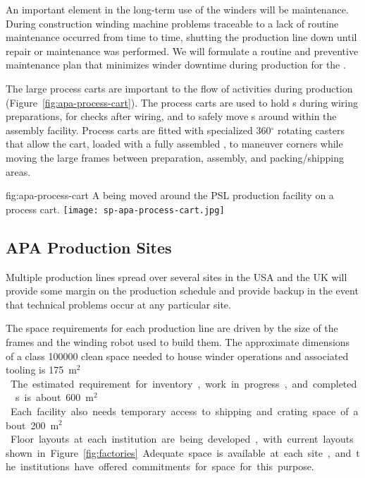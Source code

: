 An important element in the long-term use of the winders %
will be maintenance.  %
During  construction winding machine problems traceable to a lack of routine maintenance occurred from time to time, shutting the production line down until repair or maintenance was performed. We will formulate a routine and preventive maintenance plan that minimizes winder downtime during  production for the .

The large process carts are important to the %
flow of activities during production %
(Figure~\ref{fig:apa-process-cart}). The process carts are used to hold s during wiring preparations,  for  checks after wiring, and to safely move s around within the assembly facility. Process carts are fitted with specialized 360$^\circ$ rotating casters that allow the cart, loaded with a fully assembled , to maneuver corners while moving the large frames between preparation, assembly, and packing/shipping areas.

\begin{dunefigure}{fig:apa-process-cart}
{A   being moved around the PSL production facility on a process cart.}
\texttt{[image: sp-apa-process-cart.jpg]}
\end{dunefigure}



\subsection{APA Production Sites}
\label{sec:fdsp-apa-prod-facility}

Multiple  production lines spread over several sites in the USA and the UK will provide some margin on the production schedule and provide backup in the event that technical problems occur at any particular site. 

The space requirements for each production line are driven by the size of the  frames and the winding robot used to build them. The approximate dimensions of a class \num{100000} clean space needed to house winder operations and associated tooling is \SI{175}{m$^2$}. The estimated requirement for inventory, work in progress, and completed s is about \SI{600}{m$^2$}. Each facility  also needs temporary access to shipping and crating space of about \SI{200}{m$^2$}. Floor layouts at each institution are being developed, with current layouts shown in Figure~\ref{fig:factories}. Adequate space is available at each site, and the institutions have offered commitments for space for this purpose. %

